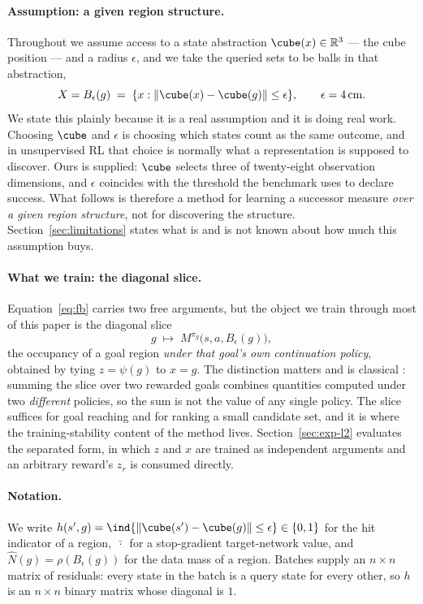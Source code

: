 \paragraph{Assumption: a given region structure.}
Throughout we assume access to a state abstraction $\cube(x)\in\mathbb{R}^{3}$ ---
the cube position --- and a radius $\epsilon$, and we take the queried sets to be
balls in that abstraction,
\begin{equation}
\label{eq:region}
X = B_\epsilon(g) \;=\; \{x : \|\cube(x)-\cube(g)\| \le \epsilon\},
\qquad \epsilon = 4\,\text{cm}.
\end{equation}
We state this plainly because it is a real assumption and it is doing real work.
Choosing $\cube$ and $\epsilon$ is choosing which states count as the same
outcome, and in unsupervised RL that choice is normally what a representation is
supposed to discover. Ours is supplied: $\cube$ selects three of twenty-eight
observation dimensions, and $\epsilon$ coincides with the threshold the benchmark
uses to declare success. What follows is therefore a method for learning a
successor measure \emph{over a given region structure}, not for discovering the
structure. Section~\ref{sec:limitations} states what is and is not known about
how much this assumption buys.

\paragraph{What we train: the diagonal slice.}
Equation~\ref{eq:fb} carries two free arguments, but the object we train through
most of this paper is the diagonal slice
\begin{equation}
\label{eq:diag}
g \;\longmapsto\; M^{\pi_g}\!\big(s,a,B_\epsilon(g)\big),
\end{equation}
the occupancy of a goal region \emph{under that goal's own continuation policy},
obtained by tying $z=\psi(g)$ to $x=g$. The distinction matters and is classical
\citep{blier2021learning}: summing the slice over two rewarded goals combines
quantities computed under two \emph{different} policies, so the sum is not the
value of any single policy. The slice suffices for goal reaching and for ranking a
small candidate set, and it is where the training-stability content of the method
lives. Section~\ref{sec:exp-l2} evaluates the separated form, in which $z$ and $x$
are trained as independent arguments and an arbitrary reward's $z_r$ is consumed
directly.

\paragraph{Notation.}
We write $h(s',g)=\ind{\|\cube(s')-\cube(g)\|\le\epsilon}\in\{0,1\}$ for the hit
indicator of a region, $\bar{\,\cdot\,}$ for a stop-gradient target-network value,
and $\hat N(g)=\rho(B_\epsilon(g))$ for the data mass of a region. Batches supply
an $n\times n$ matrix of residuals: every state in the batch is a query state for
every other, so $h$ is an $n\times n$ binary matrix whose diagonal is $1$.
